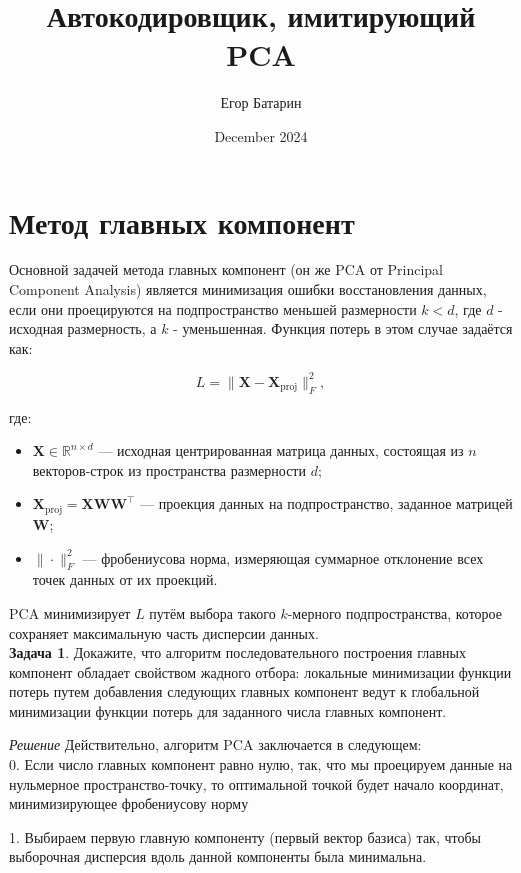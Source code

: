 \documentclass{article}
\title{Автокодировщик, имитирующий PCA}
\author{Егор Батарин}
\date{December 2024}
\begin{document}
\maketitle

\section{Метод главных компонент}


Основной задачей метода главных компонент (он же PCA от Principal Component Analysis)  является минимизация ошибки восстановления данных, если они проецируются на подпространство меньшей размерности $k<d$, где $d$ - исходная размерность, а $k$ - уменьшенная. Функция потерь в этом случае задаётся как:

\[
L = \| \mathbf{X} - \mathbf{X}_{\text{proj}} \|_F^2,
\]

где:

\begin{itemize}
    \item \( \mathbf{X} \in \mathbb{R}^{n \times d} \) — исходная центрированная матрица данных, состоящая из $n$ векторов-строк из пространства размерности $d$;
    \item \( \mathbf{X}_{\text{proj}} = \mathbf{X} \mathbf{W} \mathbf{W}^\top \) — проекция данных на подпространство, заданное матрицей \( \mathbf{W} \);
    \item \( \| \cdot \|_F^2 \) — фробениусова норма, измеряющая суммарное отклонение всех точек данных от их проекций.
\end{itemize}

PCA минимизирует \( L \) путём выбора такого \( k \)-мерного подпространства, которое сохраняет максимальную часть дисперсии данных. \\

\textbf{Задача 1}. Докажите, что алгоритм последовательного построения главных компонент обладает свойством жадного отбора: локальные минимизации функции потерь путем добавления следующих главных компонент ведут к глобальной минимизации функции потерь для заданного числа главных компонент. 

\textit{Решение}
Действительно, алгоритм PCA заключается в следующем:\\

0. Если число главных компонент равно нулю, так, что мы проецируем данные на нульмерное пространство-точку, то оптимальной точкой будет начало координат, минимизирующее фробениусову норму

1. Выбираем первую главную компоненту (первый вектор базиса) так, чтобы выборочная дисперсия вдоль данной компоненты была минимальна. 
\end{document}
